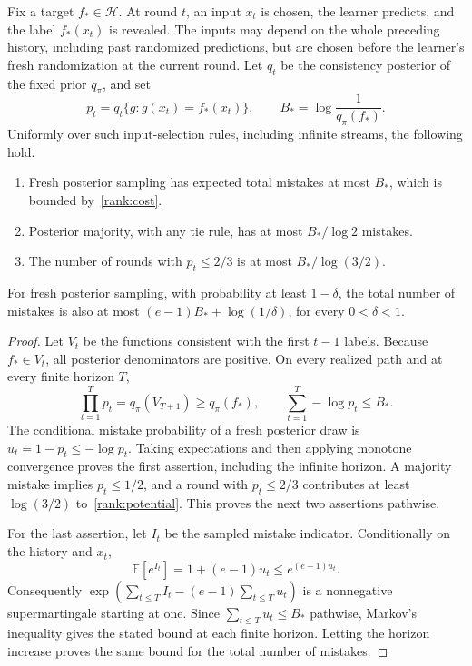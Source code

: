 \begin{theorem}
\label{rank:online}
Fix a target $f_*\in\mathcal H$. At round $t$, an input $x_t$ is chosen,
the learner predicts, and the label $f_*(x_t)$ is revealed. The inputs may
depend on the whole preceding history, including past randomized
predictions, but are chosen before the learner's fresh randomization at
the current round. Let $q_t$ be the consistency posterior of the fixed
prior $q_\pi$, and set
\[
 p_t=q_t\{g:g(x_t)=f_*(x_t)\},\qquad
 B_* =\log\frac1{q_\pi(f_*)}.
\]
Uniformly over such input-selection rules, including infinite streams,
the following hold.
\begin{enumerate}
\item Fresh posterior sampling has expected total mistakes at most
$B_*$, which is bounded by~\eqref{rank:cost}.
\item Posterior majority, with any tie rule, has at most $B_*/\log2$
mistakes.
\item The number of rounds with $p_t\le2/3$ is at most
$B_*/\log(3/2)$.
\end{enumerate}
For fresh posterior sampling, with probability at least $1-\delta$, the
total number of mistakes is also at most
$(e-1)B_*+\log(1/\delta)$, for every $0<\delta<1$.
\end{theorem}

\begin{proof}
Let $V_t$ be the functions consistent with the first $t-1$ labels.
Because $f_*\in V_t$, all posterior denominators are positive. On every
realized path and at every finite horizon $T$,
\begin{equation}\label{rank:potential}
 \prod_{t=1}^T p_t=q_\pi(V_{T+1})\ge q_\pi(f_*),
 \qquad \sum_{t=1}^T-\log p_t\le B_*.
\end{equation}
The conditional mistake probability of a fresh posterior draw is
$u_t=1-p_t\le-\log p_t$. Taking expectations and then applying monotone
convergence proves the first assertion, including the infinite horizon.
A majority mistake implies $p_t\le1/2$, and a round with $p_t\le2/3$
contributes at least $\log(3/2)$ to~\eqref{rank:potential}. This proves
the next two assertions pathwise.

For the last assertion, let $I_t$ be the sampled mistake indicator.
Conditionally on the history and $x_t$,
\[
 \mathbb E[e^{I_t}]=1+(e-1)u_t\le e^{(e-1)u_t}.
\]
Consequently $\exp(\sum_{t\le T}I_t-(e-1)\sum_{t\le T}u_t)$ is a
nonnegative supermartingale starting at one. Since
$\sum_{t\le T}u_t\le B_*$ pathwise, Markov's inequality gives the stated
bound at each finite horizon. Letting the horizon increase proves the
same bound for the total number of mistakes.
\end{proof}

